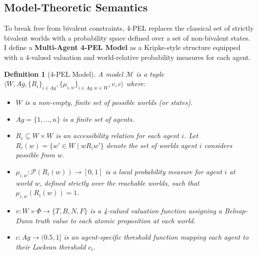 \documentclass[11pt,a4paper]{article}
\newtheorem{definition}{Definition}[section]
\begin{document}
\subsection{Model-Theoretic Semantics}
To break free from bivalent constraints, 4-PEL replaces the classical set of strictly bivalent worlds with a probability space defined over a set of non-bivalent states. I define a \textbf{Multi-Agent 4-PEL Model} as a Kripke-style structure equipped with a 4-valued valuation and world-relative probability measures for each agent.

\begin{definition}[4-PEL Model]
A model $\mathcal{M}$ is a tuple $\langle W, Ag, \{R_i\}_{i \in Ag}, \{\mu_{i,w}\}_{i \in Ag, w \in W}, v, c \rangle$ where:
\begin{itemize}
    \item $W$ is a non-empty, finite set of possible worlds (or states).
    \item $Ag = \{1, \dots, n\}$ is a finite set of agents.
    \item $R_i \subseteq W \times W$ is an accessibility relation for each agent $i$. Let $R_i(w) = \{w' \in W \mid w R_i w'\}$ denote the set of worlds agent $i$ considers possible from $w$.
    \item $\mu_{i,w}: \mathcal{P}(R_i(w)) \to [0, 1]$ is a local probability measure for agent $i$ at world $w$, defined strictly over the reachable worlds, such that $\mu_{i,w}(R_i(w)) = 1$.
    \item $v: W \times \Phi \to \{T, B, N, F\}$ is a 4-valued valuation function assigning a Belnap-Dunn truth value to each atomic proposition at each world.
    \item $c: Ag \to (0.5, 1]$ is an agent-specific threshold function mapping each agent to their Lockean threshold $c_i$.
\end{itemize}
\end{definition}
\end{document}
